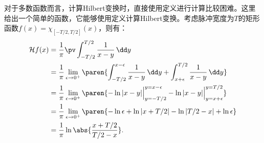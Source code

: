 \begin{example}[直接计算Hilbert变换]
    对于多数函数而言，计算Hilbert变换时，直接使用定义进行计算比较困难。这里给出一个简单的函数，它能够使用定义计算Hilbert变换。考虑脉冲宽度为$T$的矩形函数$f(x)=\chi_{[-T/2,T/2]}(x)$，则有：
    \begin{align}
        \mathcal{H}f(x)&=\frac{1}{\pi}\pv\int_{-T/2}^{T/2}\frac{1}{x-y}\,\dd y\nonumber\\
        &=\frac{1}{\pi}\lim_{\epsilon\to 0^+}\paren{\int_{-T/2}^{x-\epsilon}\frac{1}{x-y}\,\dd y+\int_{x+\epsilon}^{T/2}\frac{1}{x-y}\,\dd y}\nonumber\\
        &=\frac{1}{\pi}\lim_{\epsilon\to 0^+}\paren{-\ln|x-y|\Big|_{y=-T/2}^{y=x-\epsilon}-\ln|x-y|\Big|_{y=x+\epsilon}^{y=T/2}}\nonumber\\
        &=\frac{1}{\pi}\lim_{\epsilon\to 0^+}\paren{-\ln\epsilon+\ln|x+T/2|-\ln|T/2-x|+\ln\epsilon}\nonumber\\
        &=\frac{1}{\pi}\ln\abs{\frac{x+T/2}{T/2-x}}.
    \end{align}
\end{example}

